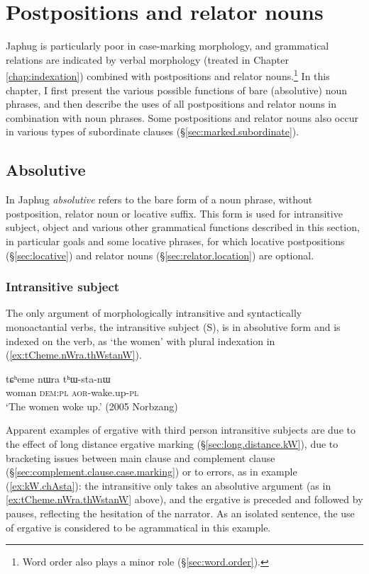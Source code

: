 \chapter{Postpositions and relator nouns} \label{chap:postpositions.relators}
Japhug is particularly poor in case-marking morphology, and grammatical relations are indicated by verbal morphology (treated in Chapter \ref{chap:indexation}) combined with postpositions and relator nouns.\footnote{Word order also plays a minor role (§\ref{sec:word.order}). } In this chapter, I first present the various possible functions of bare (absolutive) noun phrases, and then describe the uses of all postpositions and relator nouns in combination with noun phrases. Some postpositions and relator nouns also occur in various types of subordinate clauses (§\ref{sec:marked.subordinate}).
 

\section{Absolutive} \label{sec:absolutive}
In Japhug \textit{absolutive} refers to the bare form of a noun phrase, without postposition, relator noun or locative suffix. This form is used for intransitive subject, object and various other grammatical functions described in this section, in particular goals and some locative phrases, for which locative postpositions (§\ref{sec:locative}) and relator nouns (§\ref{sec:relator.location}) are optional.

\subsection{Intransitive subject} \label{sec:absolutive.S}
The only argument of morphologically intransitive and syntactically monoactantial verbs, the intransitive subject (S), is in absolutive form and is indexed on the verb, as  `the women' with plural indexation in (\ref{ex:tCheme.nWra.thWstanW}). 

\begin{exe}
\ex \label{ex:tCheme.nWra.thWstanW}
\gll tɕʰeme nɯra tʰɯ-sta-nɯ  \\
woman \textsc{dem}:\textsc{pl} \textsc{aor}-wake.up-\textsc{pl} \\
\glt  `The women woke up.'  (2005 Norbzang)
\end{exe}


Apparent examples of ergative  with third person intransitive subjects are due to the effect of long distance ergative marking (§\ref{sec:long.distance.kW}), due to bracketing issues between main clause and complement clause (§\ref{sec:complement.clause.case.marking}) or to errors, as in example (\ref{ex:kW.chAsta}): the intransitive  only takes an absolutive argument (as in \ref{ex:tCheme.nWra.thWstanW} above), and the ergative  is preceded and followed by pauses, reflecting the hesitation of the narrator. As an isolated sentence, the use of ergative is considered to be agrammatical in this example.

